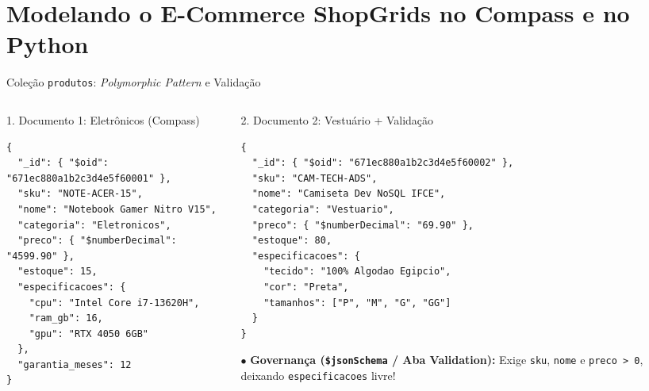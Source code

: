 \section[Prática no ShopGrids: Compass e Python]{Modelando o E-Commerce ShopGrids no Compass e no Python}

\begin{frame}[fragile]{Coleção \texttt{produtos}: \textit{Polymorphic Pattern} e Validação}
  \vspace{0.05cm}
  \begin{columns}[t]
    \begin{column}{0.48\textwidth}
      \alert{1. Documento 1: Eletrônicos (Compass)}\par
      \begin{lstlisting}[language=mongosh]
{
  "_id": { "$oid": "671ec880a1b2c3d4e5f60001" },
  "sku": "NOTE-ACER-15",
  "nome": "Notebook Gamer Nitro V15",
  "categoria": "Eletronicos",
  "preco": { "$numberDecimal": "4599.90" },
  "estoque": 15,
  "especificacoes": {
    "cpu": "Intel Core i7-13620H",
    "ram_gb": 16,
    "gpu": "RTX 4050 6GB"
  },
  "garantia_meses": 12
}
      \end{lstlisting}
    \end{column}
    \begin{column}{0.48\textwidth}
      \alert{2. Documento 2: Vestuário + Validação}\par
      \begin{lstlisting}[language=mongosh]
{
  "_id": { "$oid": "671ec880a1b2c3d4e5f60002" },
  "sku": "CAM-TECH-ADS",
  "nome": "Camiseta Dev NoSQL IFCE",
  "categoria": "Vestuario",
  "preco": { "$numberDecimal": "69.90" },
  "estoque": 80,
  "especificacoes": {
    "tecido": "100% Algodao Egipcio",
    "cor": "Preta",
    "tamanhos": ["P", "M", "G", "GG"]
  }
}
      \end{lstlisting}
      \scriptsize
      $\bullet$ \textbf{Governança (\texttt{\$jsonSchema} / Aba Validation):} Exige \texttt{sku}, \texttt{nome} e \texttt{preco > 0}, deixando \texttt{especificacoes} livre!
    \end{column}
  \end{columns}
\end{frame}

